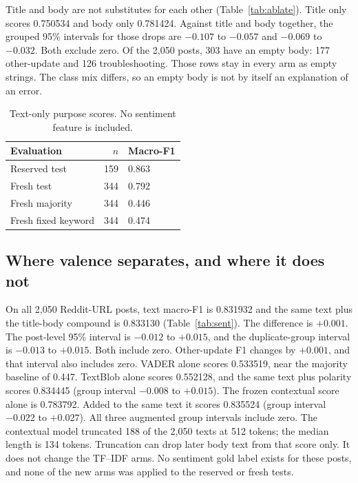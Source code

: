 \documentclass[conference,letterpaper]{IEEEtran}
\begin{document}
Title and body are not substitutes for each other (Table~\ref{tab:ablate}). Title only scores 0.750534 and body only 0.781424. Against title and body together, the grouped 95\% intervals for those drops are $-0.107$ to $-0.057$ and $-0.069$ to $-0.032$. Both exclude zero. Of the 2,050 posts, 303 have an empty body: 177 other-update and 126 troubleshooting. Those rows stay in every arm as empty strings. The class mix differs, so an empty body is not by itself an explanation of an error.

\begin{table}[t]
\caption{Text-only purpose scores. No sentiment feature is included.}
\label{tab:purpose}
\centering
\footnotesize
\begin{tabular}{lrl}
\toprule
Evaluation & $n$ & Macro-F1 \\
\midrule
Reserved test & 159 & 0.863 \\
Fresh test & 344 & 0.792 \\
Fresh majority & 344 & 0.446 \\
Fresh fixed keyword & 344 & 0.474 \\
\bottomrule
\end{tabular}
\end{table}

\subsection{Where valence separates, and where it does not}
On all 2,050 Reddit-URL posts, text macro-F1 is 0.831932 and the same text plus the title-body compound is 0.833130 (Table~\ref{tab:sent}). The difference is $+0.001$. The post-level 95\% interval is $-0.012$ to $+0.015$, and the duplicate-group interval is $-0.013$ to $+0.015$. Both include zero. Other-update F1 changes by $+0.001$, and that interval also includes zero. VADER alone scores 0.533519, near the majority baseline of 0.447. TextBlob alone scores 0.552128, and the same text plus polarity scores 0.834445 (group interval $-0.008$ to $+0.015$). The frozen contextual score alone is 0.783792. Added to the same text it scores 0.835524 (group interval $-0.022$ to $+0.027$). All three augmented group intervals include zero. The contextual model truncated 188 of the 2,050 texts at 512 tokens; the median length is 134 tokens. Truncation can drop later body text from that score only. It does not change the TF--IDF arms. No sentiment gold label exists for these posts, and none of the new arms was applied to the reserved or fresh tests.
\end{document}
